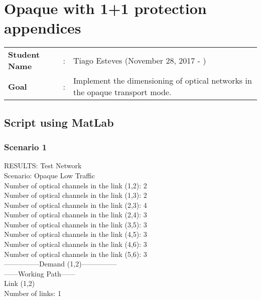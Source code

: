 \clearpage

\section{Opaque with 1+1 protection appendices}
\begin{tcolorbox}	
\begin{tabular}{p{2.75cm} p{0.2cm} p{10.5cm}} 	
\textbf{Student Name}  &:& Tiago Esteves    (November 28, 2017 - )\\
\textbf{Goal}          &:& Implement the dimensioning of optical networks in the opaque transport mode.
\end{tabular}
\end{tcolorbox}


\subsection{Script using MatLab}

\subsubsection{Scenario 1}

\qquad RESULTS: Test Network \\

\quad Scenario: Opaque Low Traffic \\

Number of optical channels in the link (1,2): 2 \\
\qquad Number of optical channels in the link (1,3): 2 \\
\qquad Number of optical channels in the link (2,3): 4 \\
\qquad Number of optical channels in the link (2,4): 3 \\
\qquad Number of optical channels in the link (3,5): 3 \\
\qquad Number of optical channels in the link (4,5): 3 \\
\qquad Number of optical channels in the link (4,6): 3 \\
\qquad Number of optical channels in the link (5,6): 3 \\

---------------Demand (1,2)--------------- \\

------Working Path------ \\
Link  (1,2) \\
Number of links: 1 \\

